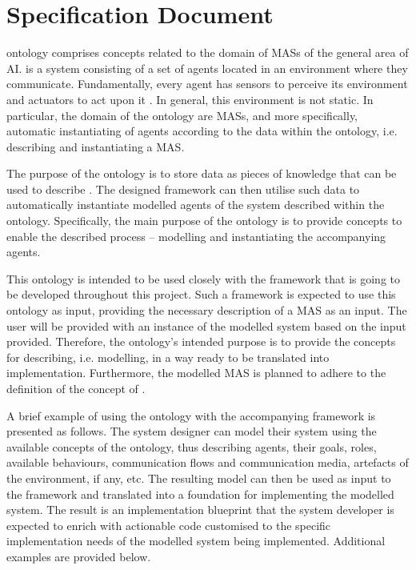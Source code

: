 \section{Specification Document}

\magoontologyname ontology
%
comprises concepts related to the domain of \acp{MAS} of the general area of \ac{AI}.  is a system consisting of a set of agents located in an environment where they communicate. Fundamentally, every agent has sensors to perceive its environment and actuators to act upon it \cite[p. 54]{russell2022ArtificialIntelligenceModern}. In general, this environment is not static. In particular, the domain of the \magoontologyname ontology are \acp{MAS}, and more specifically, automatic instantiating of agents according to the data within the ontology, i.e. describing and instantiating a \ac{MAS}.

The purpose
%
of the \magoontologyname ontology is to store data as pieces of knowledge that can be used to describe . The designed \magoontologyname framework can then utilise such data to automatically instantiate modelled agents of the system described within the ontology. Specifically, the main purpose of the \magoontologyname ontology is to provide concepts to enable the described process -- modelling  and instantiating the accompanying agents.

This ontology is intended to be used
%
closely with the \magoontologyname framework that is going to be developed throughout this project. Such a framework is expected to use this ontology as input, providing the necessary description of a \ac{MAS} as an input. The user will be provided with an instance of the modelled system based on the input provided. Therefore, the ontology's intended purpose is to provide the concepts for describing, i.e. modelling,  in a way ready to be translated into implementation. Furthermore, the modelled \ac{MAS} is planned to adhere to the definition of the concept of .

A brief example of using
%
the \magoontologyname ontology with the accompanying framework is presented as follows. The system designer can model their system using the available concepts of the ontology, thus describing agents, their goals, roles, available behaviours, communication flows and communication media, artefacts of the environment, if any, etc. The resulting model can then be used as input to the \magoontologyname framework and translated into a foundation for implementing the modelled system. The result is an implementation blueprint that the system developer is expected to enrich with actionable code customised to the specific implementation needs of the modelled system being implemented. Additional examples are provided below.%

